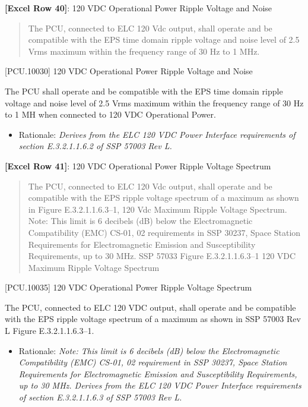 \textbf{[Excel Row 40]}: 120 VDC Operational Power Ripple Voltage and Noise

\begin{quote}
The PCU, connected to ELC 120 Vdc output, shall operate and be compatible with the EPS time domain ripple voltage and noise level of 2.5 Vrms maximum within the frequency range of 30 Hz to 1 MHz.
\end{quote}

[PCU.10030] 120 VDC Operational Power Ripple Voltage and Noise

The PCU shall operate and be compatible with the EPS time domain ripple voltage and noise level of 2.5 Vrms maximum within the frequency range of 30 Hz to 1 MH when connected to 120 VDC Operational Power.

\begin{itemize}
\item{} Rationale: \emph{Derives from the ELC 120 VDC Power Interface requirements of section E.3.2.1.1.6.2 of SSP 57003 Rev L.}

\end{itemize}

\textbf{[Excel Row 41]}: 120 VDC Operational Power Ripple Voltage Spectrum

\begin{quote}
The PCU, connected to ELC 120 Vdc output, shall operate and be compatible with the EPS ripple voltage spectrum of a maximum as shown in Figure E.3.2.1.1.6.3--1, 120 Vdc Maximum Ripple Voltage Spectrum.
Note: This limit is 6 decibels (dB) below the Electromagnetic Compatibility (EMC) CS-01, 02 requirements in SSP 30237, Space Station Requirements for Electromagnetic Emission and Susceptibility Requirements, up to 30 MHz.
SSP 57033 Figure E.3.2.1.1.6.3--1 120 VDC Maximum Ripple Voltage Spectrum
\end{quote}

[PCU.10035] 120 VDC Operational Power Ripple Voltage Spectrum

The PCU, connected to ELC 120 VDC output, shall operate and be compatible with the EPS ripple voltage spectrum of a maximum as shown in SSP 57003 Rev L Figure E.3.2.1.1.6.3--1.

\begin{itemize}
\item{} Rationale: \emph{Note: This limit is 6 decibels (dB) below the Electromagnetic Compatibility (EMC) CS-01, 02 requirement in SSP 30237, Space Station Requirements for Electromagnetic Emission and Susceptibility Requirements, up to 30 MHz. Derives from the ELC 120 VDC Power Interface requirements of section E.3.2.1.1.6.3 of SSP 57003 Rev L.}

\end{itemize}


